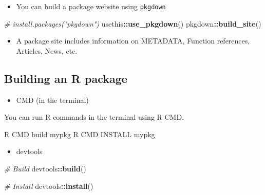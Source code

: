 \documentclass[
]{book}
\newenvironment{Shaded}{\begin{snugshade}}{\end{snugshade}}
\newcommand{\CommentTok}[1]{\textcolor[rgb]{0.56,0.35,0.01}{\textit{#1}}}
\newcommand{\ExtensionTok}[1]{#1}
\newcommand{\KeywordTok}[1]{\textcolor[rgb]{0.13,0.29,0.53}{\textbf{#1}}}
\newcommand{\NormalTok}[1]{#1}
\newcommand{\OperatorTok}[1]{\textcolor[rgb]{0.81,0.36,0.00}{\textbf{#1}}}
\providecommand{\tightlist}{%
  \setlength{\itemsep}{0pt}\setlength{\parskip}{0pt}}
\begin{document}
\begin{itemize}
\tightlist
\item
  You can build a package website using \texttt{pkgdown}
\end{itemize}

\begin{Shaded}
\begin{Highlighting}[]
\CommentTok{\# install.packages("pkgdown")}
\NormalTok{usethis}\OperatorTok{::}\KeywordTok{use\_pkgdown}\NormalTok{()}
\NormalTok{pkgdown}\OperatorTok{::}\KeywordTok{build\_site}\NormalTok{()}
\end{Highlighting}
\end{Shaded}

\begin{itemize}
\tightlist
\item
  A package site includes information on METADATA, Function references, Articles, News, etc.
\end{itemize}

\hypertarget{building-an-r-package}{%
\subsection{Building an R package}\label{building-an-r-package}}

\begin{itemize}
\tightlist
\item
  CMD (in the terminal)
\end{itemize}

You can run R commands in the terminal using R CMD.

\begin{Shaded}
\begin{Highlighting}[]
\ExtensionTok{R}\NormalTok{ CMD build mypkg }
\ExtensionTok{R}\NormalTok{ CMD INSTALL mypkg }
\end{Highlighting}
\end{Shaded}

\begin{itemize}
\tightlist
\item
  devtools
\end{itemize}

\begin{Shaded}
\begin{Highlighting}[]
\CommentTok{\# Build }
\NormalTok{devtools}\OperatorTok{::}\KeywordTok{build}\NormalTok{()}

\CommentTok{\# Install }
\NormalTok{devtools}\OperatorTok{::}\KeywordTok{install}\NormalTok{()}
\end{Highlighting}
\end{Shaded}
\end{document}
